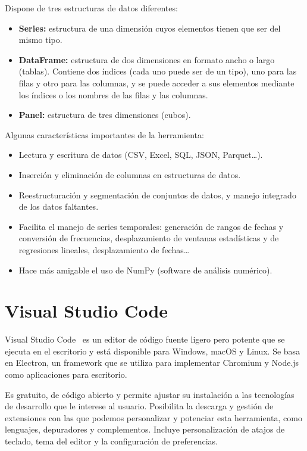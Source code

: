\documentclass[a4paper, 12pt]{book}
\begin{document}
\vspace{5mm}
Dispone de tres estructuras de datos diferentes:
\begin{itemize}
    \item \textbf{Series: } estructura de una dimensión cuyos elementos tienen que ser del mismo tipo.
    \item \textbf{DataFrame: } estructura de dos dimensiones en formato ancho o largo (tablas).
    Contiene dos índices (cada uno puede ser de un tipo), uno para las filas y otro para las columnas, y se puede acceder a sus elementos mediante los índices o los nombres de las filas y las columnas.
    \item \textbf{Panel: } estructura de tres dimensiones (cubos).
\end{itemize}

\vspace{5mm}
Algunas características importantes de la herramienta:
\begin{itemize}
    \item Lectura y escritura de datos (CSV, Excel, SQL, JSON, Parquet\ldots).
    \item Inserción y eliminación de columnas en estructuras de datos.
    \item Reestructuración y segmentación de conjuntos de datos, y manejo integrado de los datos faltantes.
    \item Facilita el manejo de series temporales: generación de rangos de fechas y conversión de frecuencias, desplazamiento de ventanas estadísticas y de regresiones lineales, desplazamiento de fechas…
    \item Hace más amigable el uso de NumPy (software de análisis numérico).
\end{itemize}

\section{Visual Studio Code} 
\label{sec:visual-studio-code}

Visual Studio Code~\cite{visualstudio} es un editor de código fuente ligero pero potente que se ejecuta en el escritorio y está disponible para Windows, macOS y Linux.
Se basa en Electron, un framework que se utiliza para implementar Chromium y Node.js como aplicaciones para escritorio.

\vspace{5mm}
Es gratuito, de código abierto y permite ajustar su instalación a las tecnologías de desarrollo que le interese al usuario.
Posibilita la descarga y gestión de extensiones con las que podemos personalizar y potenciar esta herramienta, como lenguajes, depuradores y complementos.
Incluye personalización de atajos de teclado, tema del editor y la configuración de preferencias.
\end{document}
